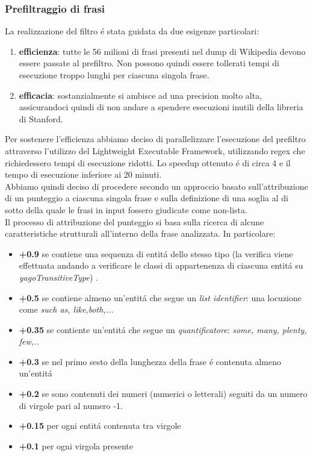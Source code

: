\documentclass[twocolumn,10pt]{asme2ej}
\begin{document}
 \subsubsection{Prefiltraggio di frasi}
 La realizzazione del filtro \'e stata guidata da due esigenze particolari:
 \begin{enumerate}
\item \textbf{efficienza}: tutte le 56 milioni di frasi presenti nel dump di Wikipedia devono essere passate al prefiltro. Non possono quindi essere tollerati tempi di esecuzione troppo lunghi per ciascuna singola frase.
\item \textbf{efficacia}:  sostanzialmente  si ambisce ad una precision molto alta, assicurandoci quindi di non andare a spendere esecuzioni inutili della libreria di Stanford. 
\end{enumerate}
Per sostenere l'efficienza abbiamo deciso di parallelizzare l'esecuzione del prefiltro attraverso l'utilizzo del Lightweight Executable Framework, utilizzando regex che richiedessero tempi di esecuzione ridotti. Lo speedup ottenuto \'e di circa 4 e il tempo di esecuzione inferiore ai 20 minuti.\\
Abbiamo quindi deciso di procedere secondo un approccio basato sull'attribuzione di un punteggio a ciascuna singola frase e sulla definizione di una soglia al di sotto della quale  le frasi in input fossero giudicate come non-lista. \\Il processo di attribuzione del punteggio si basa sulla ricerca di alcune caratteristiche strutturali all'interno della frase analizzata. In particolare:
\begin{itemize} 
\item \textbf{+0.9} se contiene una sequenza di entit\'a dello stesso tipo (la verifica viene effettuata andando a verificare le classi di appartenenza di ciascuna entit\'a su \textit{yagoTransitiveType}) . 
\item \textbf{+0.5} se contiene almeno un'entit\'a che segue un \textit{list identifier}: una locuzione come \textit{such as, like,both,...}
\item \textbf{+0.35} se contiente un'entit\'a che segue un \textit{quantificatore}: \textit{some, many, plenty, few,..}
\item \textbf{+0.3} se nel primo sesto della lunghezza della frase \'e contenuta almeno un'entit\'a 
\item \textbf{+0.2} se sono contenuti dei numeri (numerici o letterali) seguiti da un numero di virgole pari al numero -1.
\item \textbf{+0.15} per ogni entit\'a contenuta tra virgole
\item \textbf{+0.1} per ogni virgola presente

\end{itemize}
\end{document}
